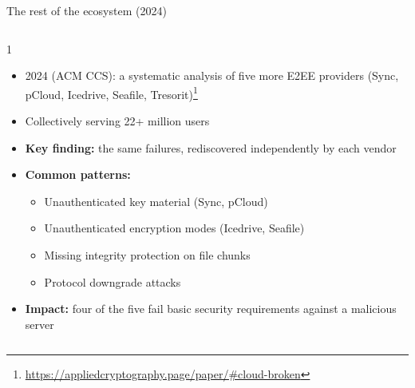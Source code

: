 \ifdefined\PRESENTATION\else\PassOptionsToClass{handout}{beamer}\fi\documentclass[aspectratio=169, lualatex]{beamer}
\begin{document}
\begin{frame}{The rest of the ecosystem (2024)}
	\begin{columns}[c]
		\begin{column}{1\textwidth}
			\begin{itemize}
				\item 2024 (ACM CCS): a systematic analysis of five more E2EE providers (Sync, pCloud, Icedrive, Seafile, Tresorit)\footnote{\url{https://appliedcryptography.page/paper/\#cloud-broken}}
				\item Collectively serving 22+ million users
				\item \textbf{Key finding:} the same failures, rediscovered independently by each vendor
				\item \textbf{Common patterns:}
				      \begin{itemize}
					      \item Unauthenticated key material (Sync, pCloud)
					      \item Unauthenticated encryption modes (Icedrive, Seafile)
					      \item Missing integrity protection on file chunks
					      \item Protocol downgrade attacks
				      \end{itemize}
				\item \textbf{Impact:} four of the five fail basic security requirements against a malicious server
			\end{itemize}
		\end{column}
	\end{columns}
\end{frame}
\end{document}
